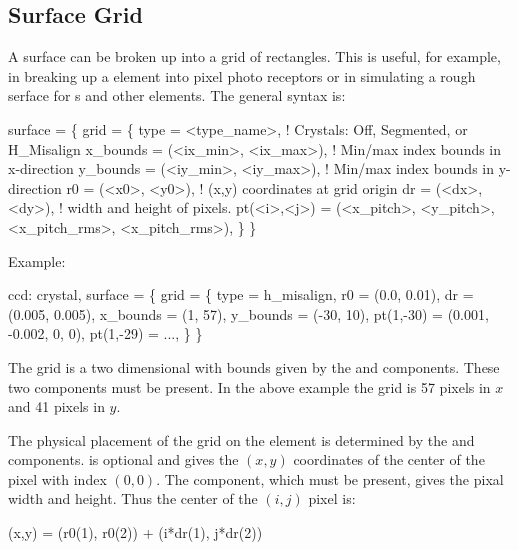 \subsection{Surface Grid}
\label{s:surf.grid}

A surface can be broken up into a grid of rectangles. This is useful,
for example, in breaking up a  element into pixel photo
receptors or in simulating a rough serface for s and other
elements. The general syntax is:
\begin{example}
  surface = \{
    grid = \{                
      type = <type_name>,               ! Crystals: Off, Segmented, or H_Misalign
      x_bounds = (<ix_min>, <ix_max>),  ! Min/max index bounds in x-direction
      y_bounds = (<iy_min>, <iy_max>),  ! Min/max index bounds in y-direction
      r0 = (<x0>, <y0>),                ! (x,y) coordinates at grid origin
      dr = (<dx>, <dy>),                ! width and height of pixels.
      pt(<i>,<j>) = (<x_pitch>, <y_pitch>, <x_pitch_rms>, <x_pitch_rms>),
          \} \}
\end{example}
Example:
\begin{example}
  ccd: crystal, surface = \{
          grid = \{
            type = h_misalign,
            r0 = (0.0, 0.01), dr = (0.005, 0.005),
            x_bounds = (1, 57), y_bounds = (-30, 10),
            pt(1,-30) = (0.001, -0.002, 0, 0), 
            pt(1,-29) = ..., 
          \} \}
\end{example}

The grid is a two dimensional with bounds given by the 
and  components. These two components must be present. In
the above example the grid is 57 pixels in $x$ and 41 pixels in $y$.

The physical placement of the grid on the element is determined by the
 and  components.  is optional and gives the
$(x,y)$ coordinates of the center of the pixel with index $(0,0)$. The
 component, which must be present, gives the pixal width and
height. Thus the center of the $(i,j)$ pixel is:
\begin{example}
  (x,y) = (r0(1), r0(2)) + (i*dr(1), j*dr(2))
\end{example}

